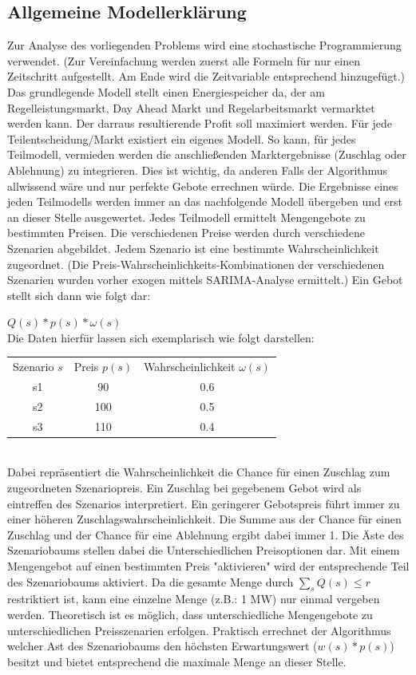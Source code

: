 \documentclass{article}
\begin{document}
\subsection{Allgemeine Modellerklärung}
Zur Analyse des vorliegenden Problems wird eine stochastische Programmierung verwendet. 
(Zur Vereinfachung werden zuerst alle Formeln für nur einen Zeitschritt aufgestellt. Am Ende wird die Zeitvariable entsprechend hinzugefügt.)
\\
Das grundlegende Modell stellt einen Energiespeicher da, der am Regelleistungsmarkt, Day Ahead Markt und Regelarbeitsmarkt vermarktet werden kann. Der darraus resultierende Profit soll maximiert werden. Für jede Teilentscheidung/Markt existiert ein eigenes Modell. So kann, für jedes Teilmodell, vermieden werden die anschließenden Marktergebnisse (Zuschlag oder Ablehnung) zu integrieren. Dies ist wichtig, da anderen Falls der Algorithmus allwissend wäre und nur perfekte Gebote errechnen würde. Die Ergebnisse eines jeden Teilmodells werden immer an das nachfolgende Modell übergeben und erst an dieser Stelle ausgewertet. Jedes Teilmodell ermittelt Mengengebote zu bestimmten Preisen. Die verschiedenen Preise werden durch verschiedene Szenarien abgebildet. Jedem Szenario ist eine bestimmte Wahrscheinlichkeit zugeordnet. (Die Preis-Wahrscheinlichkeits-Kombinationen der verschiedenen Szenarien wurden vorher exogen mittels SARIMA-Analyse ermittelt.) Ein Gebot stellt sich dann wie folgt dar:

$Q(s) * p(s) * \omega(s)$\\
Die Daten hierfür lassen sich exemplarisch wie folgt darstellen:\\
\begin{tabular}{c|c|c}
     Szenario $s$& Preis $p(s)$ & Wahrscheinlichkeit $\omega(s)$ \\
     s1       & 90 & 0.6 \\
     s2       & 100 & 0.5 \\
     s3       & 110 & 0.4 \\
\end{tabular}\\


Dabei repräsentiert die Wahrscheinlichkeit die Chance für einen Zuschlag zum zugeordneten Szenariopreis. Ein Zuschlag bei gegebenem Gebot wird als eintreffen des Szenarios interpretiert. Ein geringerer Gebotspreis führt immer zu einer höheren Zuschlagswahrscheinlichkeit. Die Summe aus der Chance für einen Zuschlag und der Chance für eine Ablehnung ergibt dabei immer 1. Die Äste des Szenariobaums stellen dabei die Unterschiedlichen Preisoptionen dar. Mit einem Mengengebot auf einen bestimmten Preis "aktivieren" wird der entsprechende Teil des Szenariobaums aktiviert. Da die gesamte Menge durch $\sum_s Q(s) \leq r$  restriktiert ist, kann eine einzelne Menge (z.B.: 1 MW) nur einmal vergeben werden. Theoretisch ist es möglich, dass unterschiedliche Mengengebote zu unterschiedlichen Preisszenarien erfolgen. Praktisch errechnet der Algorithmus welcher Ast des Szenariobaums den höchsten Erwartungswert ($w(s)*p(s)$) besitzt und bietet entsprechend die maximale Menge an dieser Stelle. \\
 
\end{document}
